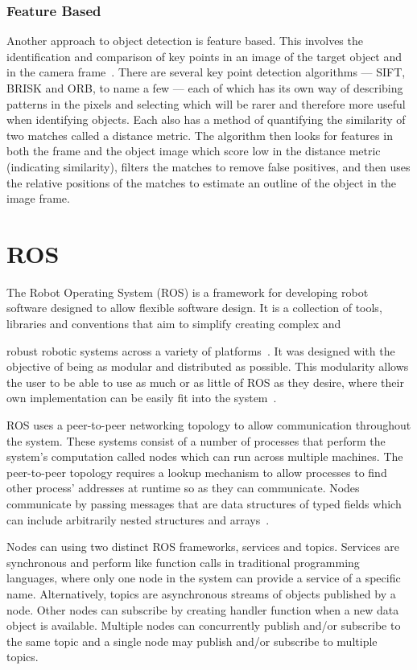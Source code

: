 \subsubsection{Feature Based}\label{litreview/cv/objDet/fb}
Another approach to object detection is feature based. This 
involves the identification and comparison of key points in an 
image of the target object and in the camera frame~\cite{lowe2004distinctive}. There are 
several key point detection algorithms --- SIFT, BRISK and ORB, 
to name a few --- each of which has its own way of describing 
patterns in the pixels and selecting which will be rarer and 
therefore more useful when identifying objects. Each also has 
a method of quantifying the similarity of two matches called a 
distance metric. The algorithm then looks for features in both 
the frame and the object image which score low in the distance 
metric (indicating similarity), filters the matches to remove 
false positives, and then uses the relative positions of the 
matches to estimate an outline of the object in the image 
frame. 

\section{ROS}\label{litreview/ROS}
The Robot Operating System (ROS) is a framework for developing robot
software designed to allow flexible software design. It is a collection of tools, 
libraries and conventions that aim to simplify creating complex and 

robust robotic systems across a variety of platforms~\cite{aboutROS}. 
It was designed with the objective of being as modular and distributed
as possible. This modularity allows the user to be able to use as much or
as little of ROS as they desire, where their own implementation can be
easily fit into the system~\cite{rosForMe}.

ROS uses a peer-to-peer networking topology to allow communication 
throughout the system. These systems consist of a number of processes  
that perform the system's computation called nodes which can  
run across multiple machines. The peer-to-peer topology requires 
a lookup mechanism to allow processes to find other process' addresses at 
runtime so as they can communicate. Nodes communicate by passing messages 
that are data structures of typed fields which can include arbitrarily nested 
structures and arrays~\cite{crick2017rosbridge}.


Nodes can using two distinct ROS frameworks, services and topics. 
Services are synchronous and perform like function
calls in traditional programming languages, where only one node in the 
system can provide a service of a specific name. Alternatively, topics are
asynchronous streams of objects published by a node. Other nodes can 
subscribe by creating  handler function when a new data object is available.
Multiple nodes can concurrently publish and/or subscribe to the same topic and
a single node may publish and/or subscribe to multiple topics.

